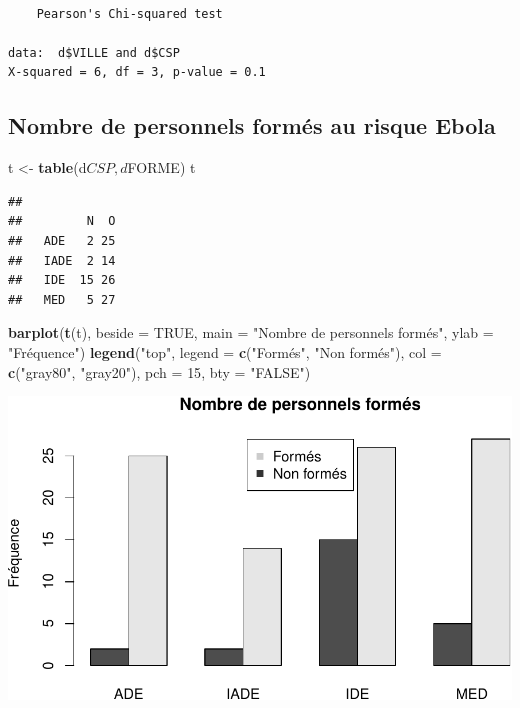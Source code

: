\documentclass[]{article}
\newenvironment{Shaded}{\begin{snugshade}}{\end{snugshade}}
\newcommand{\KeywordTok}[1]{\textcolor[rgb]{0.13,0.29,0.53}{\textbf{{#1}}}}
\newcommand{\DataTypeTok}[1]{\textcolor[rgb]{0.13,0.29,0.53}{{#1}}}
\newcommand{\DecValTok}[1]{\textcolor[rgb]{0.00,0.00,0.81}{{#1}}}
\newcommand{\StringTok}[1]{\textcolor[rgb]{0.31,0.60,0.02}{{#1}}}
\newcommand{\OtherTok}[1]{\textcolor[rgb]{0.56,0.35,0.01}{{#1}}}
\newcommand{\NormalTok}[1]{{#1}}
\begin{document}
\begin{verbatim}

    Pearson's Chi-squared test

data:  d$VILLE and d$CSP
X-squared = 6, df = 3, p-value = 0.1
\end{verbatim}

\subsection{Nombre de personnels formés au risque
Ebola}\label{nombre-de-personnels-formes-au-risque-ebola}

\begin{Shaded}
\begin{Highlighting}[]
\NormalTok{t <-}\StringTok{ }\KeywordTok{table}\NormalTok{(d$CSP , d$FORME)}
\NormalTok{t}
\end{Highlighting}
\end{Shaded}

\begin{verbatim}
##       
##         N  O
##   ADE   2 25
##   IADE  2 14
##   IDE  15 26
##   MED   5 27
\end{verbatim}

\begin{Shaded}
\begin{Highlighting}[]
\KeywordTok{barplot}\NormalTok{(}\KeywordTok{t}\NormalTok{(t), }\DataTypeTok{beside =} \OtherTok{TRUE}\NormalTok{, }\DataTypeTok{main =} \StringTok{"Nombre de personnels formés"}\NormalTok{, }\DataTypeTok{ylab =} \StringTok{"Fréquence"}\NormalTok{)}
\KeywordTok{legend}\NormalTok{(}\StringTok{"top"}\NormalTok{, }\DataTypeTok{legend =} \KeywordTok{c}\NormalTok{(}\StringTok{"Formés"}\NormalTok{, }\StringTok{"Non formés"}\NormalTok{), }\DataTypeTok{col =} \KeywordTok{c}\NormalTok{(}\StringTok{"gray80"}\NormalTok{, }\StringTok{"gray20"}\NormalTok{), }\DataTypeTok{pch =} \DecValTok{15}\NormalTok{, }\DataTypeTok{bty =} \StringTok{"FALSE"}\NormalTok{)}
\end{Highlighting}
\end{Shaded}

\includegraphics{analyse_files/figure-latex/unnamed-chunk-6-1.pdf}
\end{document}
